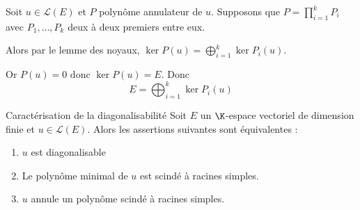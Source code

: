\begin{corollaire}{}{}
    Soit $u \in \mathscr L(E)$ et $P$ polynôme annulateur de $u$. Supposons que 
    $P = \displaystyle \prod_{i = 1}^{ k } P_i$ avec $P_1, \ldots, P_k$ deux à deux premiers entre eux.

    Alors par le lemme des noyaux, $\ker P(u) = \bigoplus_{i = 1 }^{ k } \ker P_i(u)$.

    Or $P(u) = 0$ donc $\ker P(u) = E$. Donc 
    $$E = \bigoplus_{i = 1 }^{ k } \ker P_i(u)$$
\end{corollaire}

\begin{theoreme}{Caractérisation de la diagonalisabilité}{}
    Soit $E$ un $\K$-espace vectoriel de dimension finie et $u \in \mathscr L(E)$. 
    Alors les assertions suivantes sont équivalentes :
    \begin{enumerate}
        \item $u$ est diagonalisable
        \item Le polynôme minimal de $u$ est scindé à racines simples.
        \item $u$ annule un polynôme scindé à racines simples.
    \end{enumerate}
\end{theoreme}

